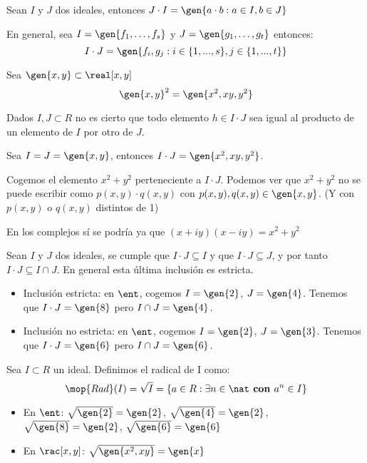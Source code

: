 \begin{defn}
	Sean $I$ y $J$ dos ideales, entonces $J\cdot I = \gen{a\cdot b: a \in I, b \in J}$

	En general, sea $I=\gen{f_1,\dotsc ,f_s}$ y $J=\gen{g_1,\dotsc,g_t}$ entonces:
	$$I\cdot J=\gen{ f_i, g_j: i \in \{1,...,s\}, j \in \{1,...,t\}}$$
\end{defn}

\begin{example} Sea $\gen{x,y} \subset \real[x,y]$
	$$\gen{x,y}^2 = \gen{x^2,xy,y^2}$$
\end{example}

\obs Dados $I,J \subset R$ no es cierto que todo elemento $h \in I\cdot J$ sea igual al producto de un elemento de $I$ por otro de $J$.

\begin{example}
	Sea $I=J=\gen{x,y}$, entonces $I\cdot J = \gen{x^2,xy,y^2}$.

	Cogemos el elemento $x^2 + y^2$ perteneciente a $I\cdot J$. Podemos ver que $x^2 + y^2$ no se puede escribir como $p(x,y) \cdot q(x,y)$ con $p(x,y),q(x,y) \in \gen{x,y}$. (Y con $p(x,y)$ o $q(x,y)$ distintos de 1)

	\obs En los complejos sí se podría ya que $(x+iy)(x-iy)=x^2 + y^2$
\end{example}

\obs Sean $I$ y $J$ dos ideales, se cumple que $I\cdot J \subseteq I$ y que $I \cdot J \subseteq J$, y por tanto $I \cdot J \subseteq I \cap J$. En general esta última inclusión es estricta.

\begin{example}
	\begin{itemize}
\item Inclusión estricta: en $\ent$, cogemos $I=\gen{2}$, $J=\gen{4}$. Tenemos que $I\cdot J=\gen{8}$ pero $I\cap J=\gen{4}$.
\item Inclusión no estricta: en $\ent$, cogemos $I=\gen{2}$, $J=\gen{3}$. Tenemos que $I\cdot J=\gen{6}$ pero $I\cap J=\gen{6}$.
	\end{itemize}
\end{example}

\begin{defn} \label{def:RadicalIdeal}
Sea $I \subset R$ un ideal. Definimos el radical de I como:
$$\mop{Rad}(I)=\sqrt{I}=\{a \in R: \exists n \in \nat \textbf{ con } a^n \in I \}$$
\end{defn}

\begin{example}
\begin{itemize}
	\item En $\ent$: $\sqrt{\gen{2}}=\gen{2}$, $\sqrt{\gen{4}}=\gen{2}$, $\sqrt{\gen{8}}=\gen{2}$, $\sqrt{\gen{6}}=\gen{6}$
	\item En $\rac[x,y]$: $\sqrt{\gen{x^2,xy}}=\gen{x}$
\end{itemize}
\end{example}

